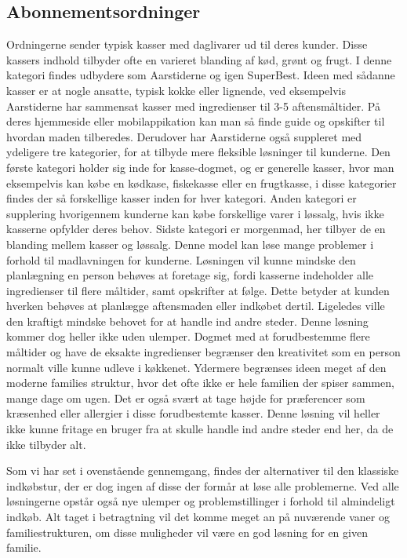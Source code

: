 \subsection{Abonnementsordninger}
Ordningerne sender typisk kasser med daglivarer ud til deres kunder.
Disse kassers indhold tilbyder ofte en varieret blanding af kød, grønt og frugt.
I denne kategori findes udbydere som Aarstiderne og igen SuperBest\citep{SOTA_MP_AAR, SOTA_MP_SB}.
Ideen med sådanne kasser er at nogle ansatte, typisk kokke eller lignende, ved eksempelvis Aarstiderne har sammensat kasser med ingredienser til 3-5 aftensmåltider.
På deres hjemmeside eller mobilappikation kan man så finde guide og opskifter til hvordan maden tilberedes.
Derudover har Aarstiderne også suppleret med ydeligere tre kategorier, for at tilbyde mere fleksible løsninger til kunderne.
Den første kategori holder sig inde for kasse-dogmet, og er generelle kasser, hvor man eksempelvis kan købe en kødkase, fiskekasse eller en frugtkasse, i disse kategorier findes der så forskellige kasser inden for hver kategori.
Anden kategori er supplering hvorigennem kunderne kan købe forskellige varer i løssalg, hvis ikke kasserne opfylder deres behov.
Sidste kategori er morgenmad, her tilbyer de en blanding mellem kasser og løssalg.
Denne model kan løse mange problemer i forhold til madlavningen for kunderne.
Løsningen vil kunne mindske den planlægning en person behøves at foretage sig, fordi kasserne indeholder alle ingredienser til flere måltider, samt opskrifter at følge.
Dette betyder at kunden  hverken behøves at planlægge aftensmaden eller indkøbet dertil.
Ligeledes ville den kraftigt mindske behovet for at handle ind andre steder.
Denne løsning kommer dog heller ikke uden ulemper.
Dogmet med at forudbestemme flere måltider og have de eksakte ingredienser begrænser den kreativitet som en person normalt ville kunne udleve i køkkenet.
Ydermere begrænses ideen meget af den moderne families struktur, hvor det ofte ikke er hele familien der spiser sammen, mange dage om ugen. 
Det er også svært at tage højde for præferencer som kræsenhed eller allergier i disse forudbestemte kasser.
Denne løsning vil heller ikke kunne fritage en bruger fra at skulle handle ind andre steder end her, da de ikke tilbyder alt.

Som vi har set i ovenstående gennemgang, findes der alternativer til den klassiske indkøbstur, der er dog ingen af disse der formår at løse alle problemerne.
Ved alle løsningerne opstår også nye ulemper og problemstillinger i forhold til almindeligt indkøb.
Alt taget i betragtning vil det komme meget an på nuværende vaner og familiestrukturen, om disse muligheder vil være en god løsning for en given familie.

